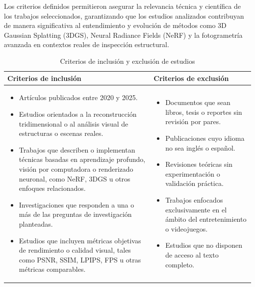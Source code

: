 \documentclass[12pt,oneside]{report}
\begin{document}
Los criterios definidos permitieron asegurar la relevancia técnica y científica de los trabajos seleccionados, garantizando que los estudios analizados contribuyan de manera significativa al entendimiento y evolución de métodos como 3D Gaussian Splatting (3DGS), Neural Radiance Fields (NeRF) y la fotogrametría avanzada en contextos reales de inspección estructural.\par


\begin{table}[htbp]
  \centering
  \caption{Criterios de inclusión y exclusión de estudios}
  \label{tab:criterios-inclusion-exclusion}
  \small
  \begin{tabular}{p{} p{}}
    \toprule
    \textbf{Criterios de inclusión} & \textbf{Criterios de exclusión} \\
    \midrule
    \begin{itemize}
      \setlength\itemsep{0.2em}
      \item Artículos publicados entre 2020 y 2025.
      \item Estudios orientados a la reconstrucción tridimensional o al análisis visual de estructuras o escenas reales.
      \item Trabajos que describen o implementan técnicas basadas en aprendizaje profundo, visión por computadora o renderizado neuronal, como NeRF, 3DGS u otros enfoques relacionados.
      \item Investigaciones que responden a una o más de las preguntas de investigación planteadas.
      \item Estudios que incluyen métricas objetivas de rendimiento o calidad visual, tales como PSNR, SSIM, LPIPS, FPS u otras métricas comparables.
    \end{itemize}
    &
    \begin{itemize}
      \setlength\itemsep{0.2em}
      \item Documentos que sean libros, tesis o reportes sin revisión por pares.
      \item Publicaciones cuyo idioma no sea inglés o español.
      \item Revisiones teóricas sin experimentación o validación práctica.
      \item Trabajos enfocados exclusivamente en el ámbito del entretenimiento o videojuegos.
      \item Estudios que no disponen de acceso al texto completo.
    \end{itemize} \\
    \bottomrule
  \end{tabular}
\end{table}
\end{document}
